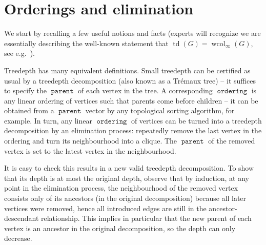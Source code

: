 \documentclass{timgad}
\title{\theTitle}
\author{Marcin Wrochna}
\affil{University of Oxford}
\date{June 2020}
\DeclareMathOperator{\td}{td}
\DeclareMathOperator{\wcol}{wcol}
\DeclareMathOperator{\parent}{\texttt{parent}}
\DeclareMathOperator{\ordering}{\texttt{ordering}}
\begin{document}
\maketitle

\begin{abstract}
	\noindent
	\href{https://github.com/marcinwrochna/sallow/releases/tag/v1.0}{github.com/marcinwrochna/sallow/releases/tag/v1.0}\\
	\href{http://doi.org/10.5281/zenodo.3870565}{10.5281/zenodo.3870565}	
	
	\medskip
	We describe a heuristic algorithm for computing treedepth decompositions, submitted for the \href{https://pacechallenge.org/2020}{PACE 2020} challenge. It relies on a variety of greedy algorithms computing elimination orderings, as well as a Divide \& Conquer approach on balanced cuts obtained using a from-scratch reimplementation of the 2016 FlowCutter algorithm by Hamann \& Strasser's FlowCutter~\cite{HamannS18}.
\end{abstract}


\section{Orderings and elimination}
We start by recalling a few useful notions and facts (experts will recognize we are essentially describing the well-known statement that $\td(G) = \wcol_\infty(G)$, see e.g.~\cite[Lemma 6.5]{sparsityTreedepth}).

Treedepth has many equivalent definitions.
Small treedepth can be certified as usual by a treedepth decomposition (also known as a Trémaux tree) -- it suffices to specify the $\parent$ of each vertex in the tree.
A corresponding $\ordering$ is any linear ordering of vertices such that parents come before children -- it can be obtained from a $\parent$ vector by any topological sorting algorithm, for example.
In turn, any linear $\ordering$ of vertices can be turned into a treedepth decomposition by an elimination process:
repeatedly remove the last vertex in the ordering and turn its neighbourhood into a clique.
The $\parent$ of the removed vertex is set to the latest vertex in the neighbourhood.

It is easy to check this results in a new valid treedepth decomposition.
To show that its depth is at most the original depth, 
observe that by induction, at any point in the elimination process, 
the neighbourhood of the removed vertex consists only of its ancestors (in the original decomposition)
because all later vertices were removed,
hence all introduced edges are still in the ancestor-descendant relationship.
This implies in particular that the new parent of each vertex is an ancestor in the original decomposition,
so the depth can only decrease.
\end{document}
